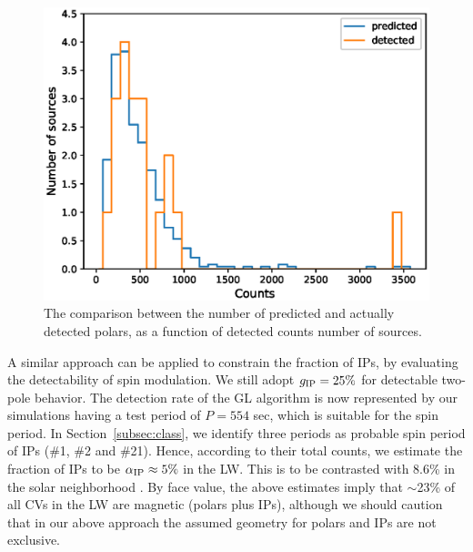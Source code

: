 \documentclass[fleqn,usenatbib]{mnras}
\begin{document}
\begin{figure}
\includegraphics[scale=0.53]{./figure/sim_LW/est_obs.eps}
\caption{The comparison between the number of predicted and actually detected polars, as a function of detected counts number of sources. \label{fig:NP_sim}}
\end{figure}


A similar approach can be applied to constrain the fraction of IPs, by evaluating the detectability of spin modulation. 
We still adopt $g_{\rm IP} = 25\%$ for detectable two-pole behavior. The detection rate of the GL algorithm is now represented by our simulations having a test period of $P=554$ sec, which is suitable for the spin period. In Section~\ref{subsec:class}, we identify three periods as probable spin period of IPs (\#1, \#2 and \#21). 
Hence, according to their total counts, we estimate the fraction of IPs to be $\alpha_{\rm IP} \approx 5\%$ in the LW. 
This is to be contrasted with 8.6\% in the solar neighborhood \citep{2003A&A...404..301R}.
By face value, the above estimates imply that $\sim$23\% of all CVs in the LW are magnetic (polars plus IPs), although we should caution that in our above approach the assumed geometry for polars and IPs are not exclusive.  
\end{document}
